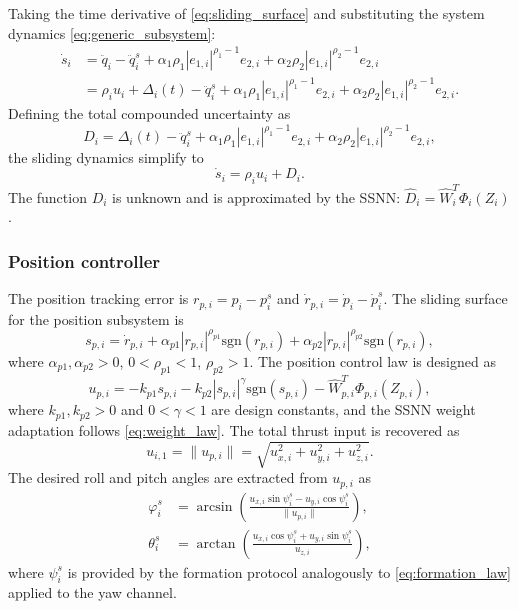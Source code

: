 Taking the time derivative of \eqref{eq:sliding_surface} and substituting the
system dynamics \eqref{eq:generic_subsystem}:
\begin{align}
    \dot{s}_i &= \ddot{q}_i - \ddot{q}_i^s
    + \alpha_1 \rho_1 |e_{1,i}|^{\rho_1-1} e_{2,i}
    + \alpha_2 \rho_2 |e_{1,i}|^{\rho_2-1} e_{2,i} \nonumber \\
    &= \rho_i u_i + \Delta_i(t) - \ddot{q}_i^s
    + \alpha_1 \rho_1 |e_{1,i}|^{\rho_1-1} e_{2,i}
    + \alpha_2 \rho_2 |e_{1,i}|^{\rho_2-1} e_{2,i}.
    \label{eq:sdot}
\end{align}
Defining the total compounded uncertainty as
\begin{equation}
    D_i = \Delta_i(t) - \ddot{q}_i^s
    + \alpha_1 \rho_1 |e_{1,i}|^{\rho_1-1} e_{2,i}
    + \alpha_2 \rho_2 |e_{1,i}|^{\rho_2-1} e_{2,i},
    \label{eq:Di}
\end{equation}
the sliding dynamics simplify to
\begin{equation}
    \dot{s}_i = \rho_i u_i + D_i.
    \label{eq:sliding_dyn}
\end{equation}
The function $D_i$ is unknown and is approximated by the SSNN:
$\hat{D}_i = \hat{W}_i^T \Phi_i(Z_i)$.

\subsubsection{Position controller}

The position tracking error is $r_{p,i} = p_i - p_i^s$ and $\dot{r}_{p,i} =
\dot{p}_i - \dot{p}_i^s$. The sliding surface for the position subsystem is \cite{formation_control_fault1}
\begin{equation}
    s_{p,i} = \dot{r}_{p,i}
    + \alpha_{p1} |r_{p,i}|^{\rho_{p1}} \text{sgn}(r_{p,i})
    + \alpha_{p2} |r_{p,i}|^{\rho_{p2}} \text{sgn}(r_{p,i}),
    \label{eq:sp}
\end{equation}
where $\alpha_{p1}, \alpha_{p2} > 0$, $0 < \rho_{p1} < 1$, $\rho_{p2} > 1$.
The position control law is designed as
\begin{equation}
    u_{p,i} = -k_{p1} s_{p,i} - k_{p2} |s_{p,i}|^\gamma \text{sgn}(s_{p,i})
    - \hat{W}_{p,i}^T \Phi_{p,i}(Z_{p,i}),
    \label{eq:up}
\end{equation}
where $k_{p1}, k_{p2} > 0$ and $0 < \gamma < 1$ are design constants, and the
SSNN weight adaptation follows \eqref{eq:weight_law}. The total thrust input is
recovered as
\begin{equation}
    u_{i,1} = \|u_{p,i}\| = \sqrt{u_{x,i}^2 + u_{y,i}^2 + u_{z,i}^2}.
    \label{eq:u1}
\end{equation}
The desired roll and pitch angles are extracted from $u_{p,i}$ as
\begin{align}
    \varphi_i^s &= \arcsin\!\left(
    \frac{u_{x,i}\sin\psi_i^s - u_{y,i}\cos\psi_i^s}{\|u_{p,i}\|}
    \right), \label{eq:phi_des}\\
    \theta_i^s  &= \arctan\!\left(
    \frac{u_{x,i}\cos\psi_i^s + u_{y,i}\sin\psi_i^s}{u_{z,i}}
    \right), \label{eq:theta_des}
\end{align}
where $\psi_i^s$ is provided by the formation protocol analogously to
\eqref{eq:formation_law} applied to the yaw channel.


